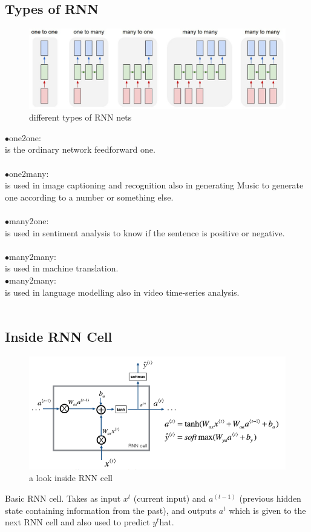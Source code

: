 \subsection{Types of RNN}
\begin{figure}[H]%
    \center%
    \includegraphics[width=\textwidth]{images/amir/diags.png}
    \caption[This is RNN types image]{different types of RNN nets}\label{fig:RNN types}%
  \end{figure}
\indent$\bullet$one2one:\\ is the ordinary network feedforward one.\\\\
\indent$\bullet$one2many:\\ is used in image captioning and recognition also in generating Music to generate one according to a number or something else.\\\\
\indent$\bullet$many2one:\\ is used in sentiment analysis to know if the sentence is positive or negative.\\\\
\indent$\bullet$many2many:\\ is used in machine translation.\\
\indent$\bullet$many2many:\\is used in language modelling also in video time-series analysis.\\\\
\subsection{Inside RNN Cell}
\begin{figure}[H]%
    \center%
    \includegraphics[width=.7\textwidth]{images/amir/Capture11.png}
    \caption[This is RNN inside image]{a look inside RNN cell}\label{fig:RNN inside}%
  \end{figure}
Basic RNN cell. Takes as input $x^t$ (current input) and $a^{(t-1)}$ (previous hidden state containing information from the past), and outputs $a^t$ which is 
given to the next RNN cell and also used to predict $y^t$hat.